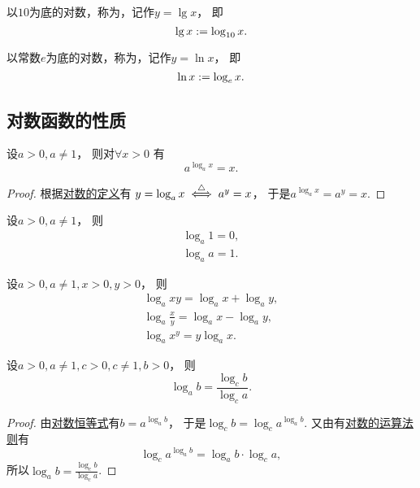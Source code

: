 以\(10\)为底的对数，称为，记作\(y = \lg x\)，
即\begin{equation}
	\lg x := \log_{10} x.
\end{equation}

以常数\(e\)为底的对数，称为，记作\(y = \ln x\)，
即\begin{equation}
	\ln x := \log_e x.
\end{equation}

\subsection{对数函数的性质}
\begin{proposition}[对数恒等式]
设\(a>0,a\neq1\)，
则对\(\forall x>0\)
有\begin{equation}\label{equation:函数.对数恒等式}
	a^{\log_a x} = x.
\end{equation}
\begin{proof}
根据\hyperref[equation:函数.对数的定义]{对数的定义}有
\(y = \log_a x
\overset{\triangle}{\iff}
a^y = x\)，
于是\(a^{\log_a x} = a^y = x\).
\end{proof}
\end{proposition}

\begin{theorem}
设\(a>0,a\neq1\)，
则\begin{gather}
	\log_a 1 = 0, \\
	\log_a a = 1.
\end{gather}
\end{theorem}

\begin{theorem}[对数的运算法则]
设\(a>0,a\neq1,x>0,y>0\)，
则\begin{gather}
	\log_a xy = \log_a x + \log_a y,
		\label{equation:函数.对数的基本运算法则1} \\
	\log_a \frac{x}{y} = \log_a x - \log_a y,
		\label{equation:函数.对数的基本运算法则2} \\
	\log_a x^y = y \log_a x.
		\label{equation:函数.对数的基本运算法则3}
\end{gather}
\end{theorem}

\begin{theorem}[换底公式]
设\(a>0,a\neq1,c>0,c\neq1,b>0\)，
则\begin{equation}\label{equation:函数.换底公式}
	\log_a b = \frac{\log_c b}{\log_c a}.
\end{equation}
\begin{proof}
由\hyperref[equation:函数.对数恒等式]{对数恒等式}有\(b = a^{\log_a b}\)，
于是\(\log_c b
= \log_c a^{\log_a b}\).
又由有\hyperref[equation:函数.对数的基本运算法则3]{对数的运算法则}有\[
	\log_c a^{\log_a b} = \log_a b \cdot \log_c a,
\]
所以\(\log_a b = \frac{\log_c b}{\log_c a}\).
\end{proof}
\end{theorem}

